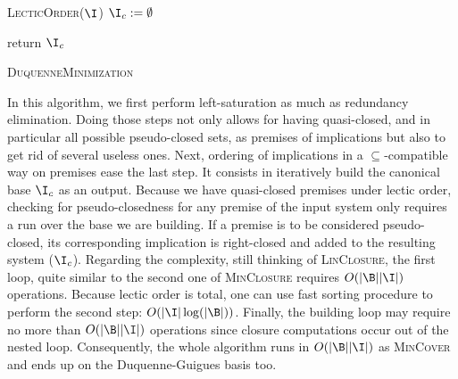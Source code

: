 \documentclass[a4paper, 10pt]{article}
\begin{document}
\begin{algorithm}
	
	\BlankLine
	\BlankLine
	
	
	\BlankLine
	
	\textsc{LecticOrder}($\I$) \;
	$\I_c := \emptyset$ \;
	
	\BlankLine
	
	
	\BlankLine
	
	return $\I_c$ \;
	
	\caption{\textsc{DuquenneMinimization}}
	\label{alg:Duquenne-min}
\end{algorithm}

In this algorithm, we first perform left-saturation as much as redundancy elimination. Doing those steps not only allows for having quasi-closed, and in particular all possible pseudo-closed sets, as premises of implications but also
to get rid of several useless ones. Next, ordering of implications in a $\subseteq$-compatible way on premises ease the last step. It consists in iteratively build the canonical base $\I_c$ as an output. Because we have quasi-closed premises under lectic order, checking for pseudo-closedness for any premise of the input system only requires a run over the base we are building. If a premise is to be considered pseudo-closed, its corresponding implication is right-closed and added to the resulting system ($\I_c$).
Regarding the complexity, still thinking of \textsc{LinClosure}, the first loop,
quite similar to the second one of \textsc{MinClosure} requires $O(|\B||\I|)$ operations. Because lectic order is total, one can use fast sorting procedure to
perform the second step: $O(|\I|\log(|\B|))$. Finally, the building loop may
require no more than $O(|\B||\I|)$ operations since closure computations occur out of the nested loop. Consequently, the whole algorithm runs in $O(|\B||\I|)$ as \textsc{MinCover} and ends up on the Duquenne-Guigues basis too.
\end{document}
